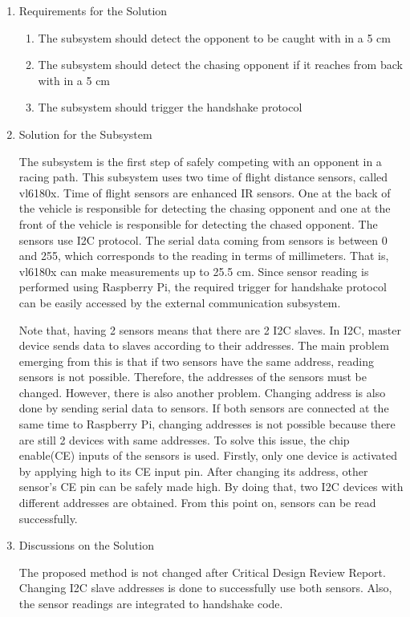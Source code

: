 \documentclass[a4paper,12pt]{article}
\begin{document}
\begin{enumerate}
	\item {Requirements for the Solution}
	
	\begin{enumerate}
		\item The subsystem should detect the opponent to be caught with in a 5 cm 
		\item The subsystem should detect the chasing opponent if it reaches from back with in a 5 cm 
		\item The subsystem should trigger the handshake protocol 
	\end{enumerate}
	
	\item {Solution for the Subsystem}
	
	The subsystem is the first step of safely competing with an opponent in a racing path. This subsystem uses two time of flight distance sensors, called vl6180x. Time of flight sensors are enhanced IR sensors. One at the back of the vehicle is responsible for detecting the chasing opponent and one at the front of the vehicle is responsible for detecting the chased opponent. The sensors use I2C protocol. The serial data coming from sensors is between 0 and 255, which corresponds to the reading in terms of millimeters. That is, vl6180x can make measurements up to 25.5 cm. Since sensor reading is performed using Raspberry Pi, the required trigger for handshake protocol can be easily accessed by the external communication subsystem.
	
	Note that, having 2 sensors means that there are 2 I2C slaves. In I2C, master device sends data to slaves according to their addresses. The main problem emerging from this is that if two sensors have the same address, reading sensors is not possible. Therefore, the addresses of the sensors must be changed. However, there is also another problem. Changing address is also done by sending serial data to sensors. If both sensors are connected at the same time to Raspberry Pi, changing addresses is not possible because there are still 2 devices with same addresses. To solve this issue, the chip enable(CE) inputs of the sensors is used. Firstly, only one device is activated by applying high to its CE input pin. After changing its address, other sensor's CE pin can be safely made high. By doing that, two I2C devices with different addresses are obtained. From this point on, sensors can be read successfully.
	
	\item {Discussions on the Solution}
	
	The proposed method is not changed after Critical Design Review Report. Changing I2C slave addresses is done to successfully use both sensors. Also, the sensor readings are integrated to handshake code.
	
	
\end{enumerate}
\end{document}
